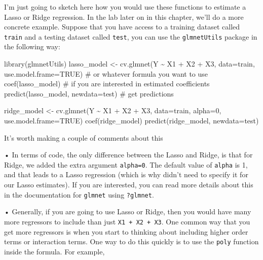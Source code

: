 \documentclass[
  letterpaper,
  DIV=11,
  numbers=noendperiod]{scrreprt}
\newenvironment{Shaded}{\begin{snugshade}}{\end{snugshade}}
\newcommand{\AttributeTok}[1]{\textcolor[rgb]{0.40,0.45,0.13}{#1}}
\newcommand{\CommentTok}[1]{\textcolor[rgb]{0.37,0.37,0.37}{#1}}
\newcommand{\ConstantTok}[1]{\textcolor[rgb]{0.56,0.35,0.01}{#1}}
\newcommand{\DecValTok}[1]{\textcolor[rgb]{0.68,0.00,0.00}{#1}}
\newcommand{\FunctionTok}[1]{\textcolor[rgb]{0.28,0.35,0.67}{#1}}
\newcommand{\NormalTok}[1]{\textcolor[rgb]{0.00,0.23,0.31}{#1}}
\newcommand{\OtherTok}[1]{\textcolor[rgb]{0.00,0.23,0.31}{#1}}
\newcommand{\SpecialCharTok}[1]{\textcolor[rgb]{0.37,0.37,0.37}{#1}}
\begin{document}
I'm just going to sketch here how you would use these functions to
estimate a Lasso or Ridge regression. In the lab later on in this
chapter, we'll do a more concrete example. Suppose that you have access
to a training dataset called \texttt{train} and a testing dataset called
\texttt{test}, you can use the \texttt{glmnetUtils} package in the
following way:

\begin{Shaded}
\begin{Highlighting}[]
\FunctionTok{library}\NormalTok{(glmnetUtils)}
\NormalTok{lasso\_model }\OtherTok{\textless{}{-}} \FunctionTok{cv.glmnet}\NormalTok{(Y }\SpecialCharTok{\textasciitilde{}}\NormalTok{ X1 }\SpecialCharTok{+}\NormalTok{ X2 }\SpecialCharTok{+}\NormalTok{ X3, }\AttributeTok{data=}\NormalTok{train, }\AttributeTok{use.model.frame=}\ConstantTok{TRUE}\NormalTok{) }\CommentTok{\# or whatever formula you want to use}
\FunctionTok{coef}\NormalTok{(lasso\_model) }\CommentTok{\# if you are interested in estimated coefficients}
\FunctionTok{predict}\NormalTok{(lasso\_model, }\AttributeTok{newdata=}\NormalTok{test) }\CommentTok{\# get predictions}

\NormalTok{ridge\_model }\OtherTok{\textless{}{-}} \FunctionTok{cv.glmnet}\NormalTok{(Y }\SpecialCharTok{\textasciitilde{}}\NormalTok{ X1 }\SpecialCharTok{+}\NormalTok{ X2 }\SpecialCharTok{+}\NormalTok{ X3, }
                         \AttributeTok{data=}\NormalTok{train, }
                         \AttributeTok{alpha=}\DecValTok{0}\NormalTok{,}
                         \AttributeTok{use.model.frame=}\ConstantTok{TRUE}\NormalTok{)}
\FunctionTok{coef}\NormalTok{(ridge\_model)}
\FunctionTok{predict}\NormalTok{(ridge\_model, }\AttributeTok{newdata=}\NormalTok{test)}
\end{Highlighting}
\end{Shaded}

It's worth making a couple of comments about this

• In terms of code, the only difference between the Lasso and Ridge, is
that for Ridge, we added the extra argument \texttt{alpha=0}. The
default value of \texttt{alpha} is 1, and that leads to a Lasso
regression (which is why didn't need to specify it for our Lasso
estimates). If you are interested, you can read more details about this
in the documentation for \texttt{glmnet} using \texttt{?glmnet}.

• Generally, if you are going to use Lasso or Ridge, then you would have
many more regressors to include than just \texttt{X1\ +\ X2\ +\ X3}. One
common way that you get more regressors is when you start to thinking
about including higher order terms or interaction terms. One way to do
this quickly is to use the \texttt{poly} function inside the formula.
For example,
\end{document}

